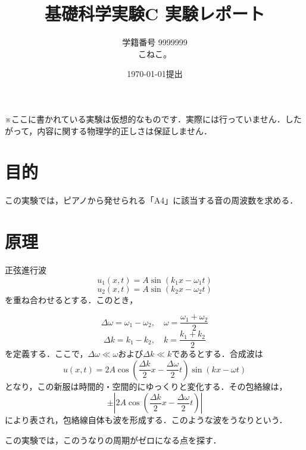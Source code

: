 \documentclass[a4paper, 9pt]{jsarticle}
\title{\textbf{基礎科学実験C 実験レポート}}
\author{学籍番号 9999999\\こねこ。}
\date{\today 提出}
\begin{document}
\maketitle

※ここに書かれている実験は仮想的なものです．実際には行っていません．したがって，内容に関する物理学的正しさは保証しません．
\section{目的}
この実験では，ピアノから発せられる「A4」に該当する音の周波数を求める．

\section{原理}
正弦進行波
\begin{equation}
  u_1(x, t) = A\sin{(k_1x - \omega_1 t)}
\end{equation}
\begin{equation}
  u_2(x, t) = A\sin{(k_2x - \omega_2 t)}
\end{equation}
を重ね合わせるとする．このとき，

\begin{equation}
  \Delta \omega = \omega_1 - \omega_2,\quad\displaystyle\omega = \frac{\omega_1 + \omega_2}{2}
\end{equation}
\begin{equation}
  \Delta k = k_1 - k_2,\quad\displaystyle k = \frac{k_1 + k_2}{2}
\end{equation}
を定義する．ここで，$\Delta \omega \ll \omega$および$\Delta k \ll k$であるとする．合成波は
\begin{equation}
  u(x, t) = 2A\cos{\left(\frac{\Delta k}{2}x - \frac{\Delta \omega}{2}t\right)}\sin{\left(kx - \omega t\right)}
\end{equation}
となり，この新服は時間的・空間的にゆっくりと変化する．その包絡線は，
\begin{equation}
  \pm \left|2A\cos{\left(\frac{\Delta k}{2}x - \frac{\Delta \omega}{2}t\right)}\right|
\end{equation}
により表され，包絡線自体も波を形成する．このような波をうなりという．\par
この実験では，このうなりの周期がゼロになる点を探す．
\end{document}
